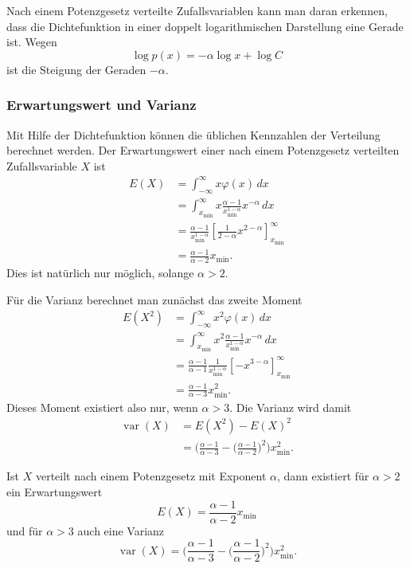 Nach einem Potenzgesetz verteilte Zufallsvariablen kann man daran
erkennen, dass die Dichtefunktion in einer doppelt logarithmischen
Darstellung eine Gerade ist.
Wegen
\[
\log p(x)=-\alpha \log x+\log C
\]
ist die Steigung der Geraden $-\alpha$.

\subsubsection{Erwartungswert und Varianz}
Mit Hilfe der Dichtefunktion können die üblichen Kennzahlen der Verteilung
berechnet werden.
Der Erwartungswert einer nach einem Potenzgesetz verteilten Zufallsvariable $X$
ist
\begin{align*}
E(X)&=
\int_{-\infty}^\infty x\varphi(x)\,dx
\\
&=
\int_{x_{\min}}^\infty 
x
\frac{\alpha-1}{x_{\min}^{1-\alpha}}
x^{-\alpha}\,dx
\\
&=
\frac{\alpha-1}{x_{\min}^{1-\alpha}}
\left[\frac{1}{2-\alpha}x^{2-\alpha}\right]_{x_{\min}}^\infty
\\
&=
\frac{\alpha-1}{\alpha-2}x_{\min}.
\end{align*}
Dies ist natürlich nur möglich, solange $\alpha > 2$.

Für die Varianz berechnet man zunächst das zweite Moment
\begin{align*}
E(X^2)&=
\int_{-\infty}^\infty x^2\varphi(x)\,dx
\\
&=
\int_{x_{\min}}^\infty 
x^2
\frac{\alpha-1}{x_{\min}^{1-\alpha}}
x^{-\alpha}\,dx
\\
&=
\frac{\alpha-1}{\alpha-1}\frac1{x_{\min}^{1-\alpha}}\left[-x^{3-\alpha}\right]_{x_{\min}}^\infty
\\
&=
\frac{\alpha-1}{\alpha-3}x_{\min}^2.
\end{align*}
Dieses Moment existiert also nur, wenn $\alpha >3$.
Die Varianz wird damit
\begin{align*}
\operatorname{var}(X)
&=
E(X^2)-E(X)^2
\\
&=
\biggl(
\frac{\alpha-1}{\alpha-3}-\biggl(\frac{\alpha-1}{\alpha-2}\biggr)^2
\biggr)x_{\min}^2.
\end{align*}
\begin{satz}
Ist $X$ verteilt nach einem Potenzgesetz mit Exponent $\alpha$, dann
existiert für $\alpha>2$ ein Erwartungswert
\[
E(X)
=
\frac{\alpha-1}{\alpha-2}x_{\min}
\]
und für $\alpha >3$ auch eine Varianz
\[
\operatorname{var}(X)
=
\biggl(
\frac{\alpha-1}{\alpha-3}-\biggl(\frac{\alpha-1}{\alpha-2}\biggr)^2
\biggr)x_{\min}^2.
\]
\end{satz}

